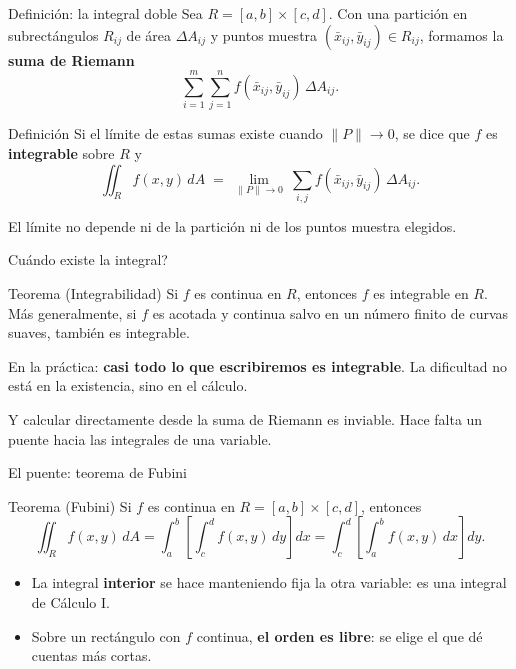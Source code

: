 \documentclass[11pt,aspectratio=169]{beamer}
\begin{document}
\begin{frame}{Definición: la integral doble}
  Sea $R=[a,b]\times[c,d]$. Con una partición en subrectángulos $R_{ij}$ de área $\Delta A_{ij}$ y puntos muestra $(\bar x_{ij},\bar y_{ij})\in R_{ij}$, formamos la \textbf{suma de Riemann}
  \[
    \sum_{i=1}^{m}\sum_{j=1}^{n} f(\bar x_{ij},\bar y_{ij})\,\Delta A_{ij}.
  \]
  \pause
  \begin{block}{Definición}
    Si el límite de estas sumas existe cuando $\|P\|\to0$, se dice que $f$ es \textbf{integrable} sobre $R$ y
    \[
      \iint_R f(x,y)\,dA \;=\; \lim_{\|P\|\to0}\ \sum_{i,j} f(\bar x_{ij},\bar y_{ij})\,\Delta A_{ij}.
    \]
  \end{block}
  \pause
  \begin{center}\small\color{gray60}
  El límite no depende ni de la partición ni de los puntos muestra elegidos.
  \end{center}
\end{frame}

\begin{frame}{\textquestiondown{}Cuándo existe la integral?}
  \begin{block}{Teorema (Integrabilidad)}
    Si $f$ es continua en $R$, entonces $f$ es integrable en $R$.\\[4pt]
    Más generalmente, si $f$ es acotada y continua salvo en un número finito de curvas suaves, también es integrable.
  \end{block}
  \pause
  \vspace{6pt}
  \begin{center}
  \normalsize En la práctica: \textbf{casi todo lo que escribiremos es integrable}. La dificultad no está en la existencia, sino en el cálculo.
  \end{center}
  \pause
  \vspace{6pt}
  \begin{center}\small\color{gray60}
  Y calcular directamente desde la suma de Riemann es inviable. Hace falta un puente hacia las integrales de una variable.
  \end{center}
\end{frame}

\begin{frame}{El puente: teorema de Fubini}
  \begin{block}{Teorema (Fubini)}
    Si $f$ es continua en $R=[a,b]\times[c,d]$, entonces
    \[
      \iint_R f(x,y)\,dA
      = \int_a^b\!\left[\int_c^d f(x,y)\,dy\right]dx
      = \int_c^d\!\left[\int_a^b f(x,y)\,dx\right]dy.
    \]
  \end{block}
  \pause
  \begin{itemize}
    \item La integral \textbf{interior} se hace manteniendo fija la otra variable: es una integral de Cálculo I.
    \pause
    \item Sobre un rectángulo con $f$ continua, \textbf{el orden es libre}: se elige el que dé cuentas más cortas.
  \end{itemize}
  \pause
\end{frame}
\end{document}
